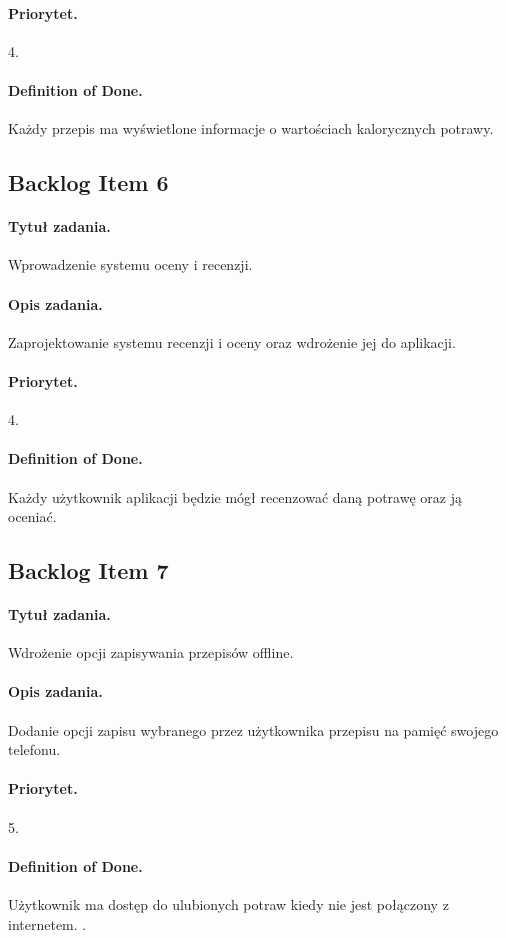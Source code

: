 \documentclass[a4paper]{article}
\begin{document}
\paragraph{Priorytet.} 4.
\paragraph{Definition of Done.} Każdy przepis ma wyświetlone informacje o wartościach kalorycznych potrawy.

\subsection{Backlog Item 6}
\paragraph{Tytuł zadania.} Wprowadzenie systemu oceny i recenzji.
\paragraph{Opis zadania.} Zaprojektowanie systemu recenzji i oceny oraz wdrożenie jej do aplikacji.
\paragraph{Priorytet.} 4.
\paragraph{Definition of Done.} Każdy użytkownik aplikacji będzie mógł recenzować daną potrawę oraz ją oceniać.

\subsection{Backlog Item 7}
\paragraph{Tytuł zadania.} Wdrożenie opcji zapisywania przepisów offline.
\paragraph{Opis zadania.} Dodanie opcji zapisu wybranego przez użytkownika przepisu na pamięć swojego telefonu.
\paragraph{Priorytet.} 5.
\paragraph{Definition of Done.} Użytkownik ma dostęp do ulubionych potraw kiedy nie jest połączony z internetem.
.
\end{document}
